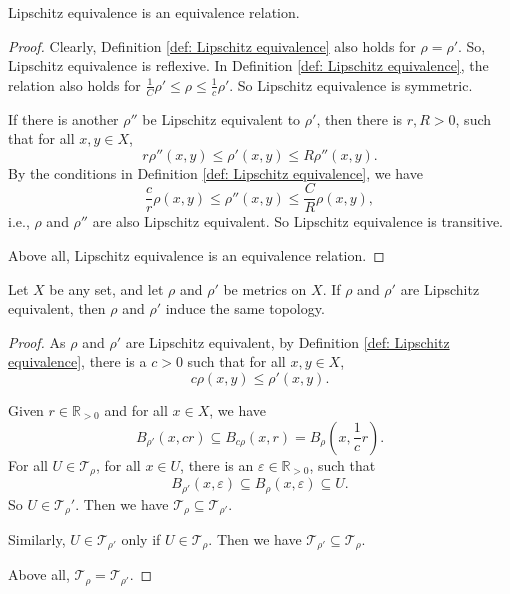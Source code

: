 \begin{theorem}
	\label{prop: Lipschitz equivalence is a equivalence relation}
	Lipschitz equivalence is an equivalence relation.
	
	\begin{proof}
		Clearly, Definition \ref{def: Lipschitz equivalence} also holds for $\rho = \rho'$. So, Lipschitz equivalence is reflexive. In Definition \ref{def: Lipschitz equivalence}, the relation also holds for $\frac{1}{C} \rho' \le \rho \le \frac{1}{c} \rho'$. So Lipschitz equivalence is symmetric.
		
		If there is another $\rho''$ be Lipschitz equivalent to $\rho'$, then there is $r, R > 0$, such that for all $x,y \in X$,
		$$
		r\rho''(x,y) \le \rho'(x,y) \le R\rho''(x,y).
		$$
		By the conditions in Definition \ref{def: Lipschitz equivalence}, we have
		$$
		\frac{c}{r} \rho(x,y) \le \rho''(x,y) \le  \frac{C}{R} \rho(x,y),
		$$
		i.e., $\rho$ and $\rho''$ are also Lipschitz equivalent. So Lipschitz equivalence is transitive.
		
		Above all, Lipschitz equivalence is an equivalence relation.
	\end{proof}
\end{theorem}


\begin{theorem}
	\label{prop: Lipschitz equivalent metrics induces the same topology}
	Let $X$ be any set, and let $\rho$ and $\rho'$ be metrics on $X$. If $\rho$ and $\rho'$ are Lipschitz equivalent, then $\rho$ and $\rho'$ induce the same topology.
	
	\begin{proof}
		As $\rho$ and $\rho'$ are Lipschitz equivalent, by Definition \ref{def: Lipschitz equivalence}, there is a $c > 0$ such that for all $x,y \in X$,
		$$
		c \rho(x,y) \le \rho'(x,y).
		$$
		
		Given $r \in \mathbb R_{> 0}$ and for all $x \in X$, we have
		$$
		B_{\rho'}(x, cr) \subseteq B_{c \rho}(x, r) = B_\rho \left( x, \frac{1}{c} r \right).
		$$
		For all $U \in \mathcal T_\rho$, for all $x \in U$, there is an $\varepsilon \in \mathbb R_{> 0}$, such that
		$$
		B_{\rho'} (x, \varepsilon) \subseteq B_{\rho}(x, \varepsilon) \subseteq U.
		$$
		So $U \in \mathcal T_\rho'$. Then we have $\mathcal T_{\rho} \subseteq \mathcal T_{\rho'}$.
		
		Similarly, $U \in \mathcal T_{\rho'}$ only if $U \in \mathcal T_\rho$. Then we have $\mathcal T_{\rho'} \subseteq \mathcal T_{\rho}$.
		
		Above all, $\mathcal T_{\rho} = \mathcal T_{\rho'}$.
	\end{proof}
\end{theorem}


